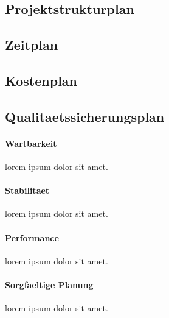 \subsection{Projektstrukturplan}
   \blindtext
\subsection{Zeitplan}
   \blindtext
\subsection{Kostenplan}
  \blindtext
\subsection{Qualitaetssicherungsplan}
  \blindtext
  \paragraph{Wartbarkeit}
  lorem ipsum dolor sit amet.
  \paragraph{Stabilitaet}
  lorem ipsum dolor sit amet.
  \paragraph{Performance}
  lorem ipsum dolor sit amet.
  \paragraph{Sorgfaeltige Planung}
  lorem ipsum dolor sit amet.
